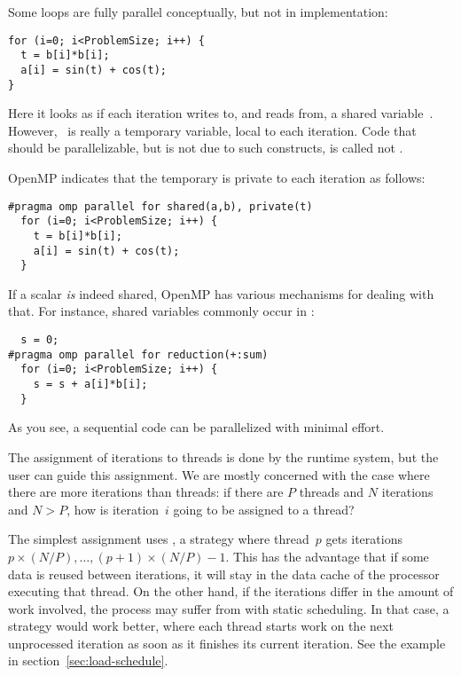 Some loops are fully parallel conceptually, but not in implementation:
\lstset{language=C}
\begin{lstlisting}
for (i=0; i<ProblemSize; i++) {
  t = b[i]*b[i];
  a[i] = sin(t) + cos(t);
}
\end{lstlisting}
Here it looks as if each iteration writes to, and reads from, a shared
variable~. However, ~is really a temporary variable,
local to each iteration. Code that should be parallelizable, but is
not due to such constructs, is called not .

OpenMP indicates that the temporary is private to each iteration as follows:
\lstset{language=C}
\begin{lstlisting}
#pragma omp parallel for shared(a,b), private(t)
  for (i=0; i<ProblemSize; i++) {
    t = b[i]*b[i];
    a[i] = sin(t) + cos(t);
  }
\end{lstlisting}
If a scalar \emph{is} indeed shared, OpenMP has various mechanisms for
dealing with that. For instance, shared variables commonly occur in
:
\lstset{language=C}
\begin{lstlisting}
  s = 0;
#pragma omp parallel for reduction(+:sum)
  for (i=0; i<ProblemSize; i++) {
    s = s + a[i]*b[i];
  }
\end{lstlisting}
As you see, a sequential code can be parallelized with minimal effort.

The assignment of iterations to threads is done by the runtime system,
but the user can guide this assignment. We are mostly concerned with
the case where there are more iterations than threads: if there are
$P$ threads and $N$ iterations and $N>P$, how is iteration~$i$ going
to be assigned to a thread?

The simplest assignment uses , a
 strategy where thread~$p$ gets iterations
$p\times(N/P),\ldots,(p+1)\times (N/P)-1$.
This has the advantage that if some data is
reused between iterations, it will stay in the data cache of the
processor executing that thread. On the other hand, if the iterations
differ in the amount of work involved, the process may suffer from
 with static scheduling. In that case, a
 strategy would work better, where each
thread starts work on the next unprocessed iteration as soon as it
finishes its current iteration. See the example in section~\ref{sec:load-schedule}.

